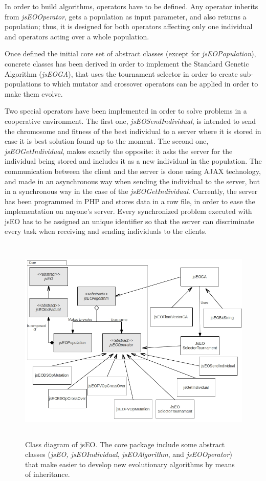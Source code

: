 \documentclass[runningheads,a4paper]{llncs}
\begin{document}
In order to build algorithms, operators have to be defined. Any operator inherits from \textit{jsEOOperator}, gets a population as input parameter, and also returns a population; thus, it is designed for both operators affecting only one individual and operators acting over a whole population.

Once defined the initial core set of abstract classes (except for \textit{jsEOPopulation}), concrete classes has been derived in order to implement the Standard Genetic Algorithm (\textit{jsEOGA}), that uses the tournament selector in order to create sub-populations to which mutator and crossover operators can be applied in order to make them evolve.

Two special operators have been implemented in order to solve problems in a cooperative environment. The first one, \textit{jsEOSendIndividual}, is intended to send the chromosome and fitness of the best individual to a server where it is stored in case it is best solution found up to the moment. The second one, \textit{jsEOGetIndividual}, makes exactly the opposite: it asks the server for the individual being stored and includes it as a new individual in the population. The communication between the client and the server is done using AJAX technology, and made in an asynchronous way when sending the individual to the server, but in a synchronous way in the case of the \textit{jsEOGetIndividual}. Currently, the server has been programmed in PHP and stores data in a row file, in order to ease the implementation on anyone's server. Every synchronized problem executed with jsEO has to be assigned an unique identifier so that the server can discriminate every task when receiving and sending individuals to the clients.

\begin{figure}
\centering
\includegraphics[height=10cm]{class-diagram}
\caption{Class diagram of jsEO. The core package include some abstract classes (\textit{jsEO, jsEOIndividual}, \textit{jsEOAlgorithm}, and \textit{jsEOOperator}) that make easier to develop new evolutionary algorithms by means of inheritance.}
\label{fig:jsEO-class-diagram}
\end{figure}
\end{document}
